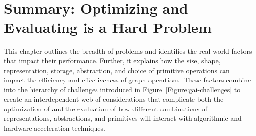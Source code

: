 \section{Summary: Optimizing and Evaluating \gai is a Hard Problem}
This chapter outlines the breadth of \gai problems and identifies the real-world factors that impact their performance.
Further, it explains how the size, shape, representation, storage, abstraction, and choice of primitive operations can impact the efficiency and effectiveness of graph operations. 
These factors combine into the hierarchy of challenges introduced in Figure~\ref{Figure:gai-challenges} to create an interdependent web of considerations that complicate both the optimization of \gai and the evaluation of how different combinations of representations, abstractions, and primitives will interact with algorithmic and hardware acceleration techniques.

